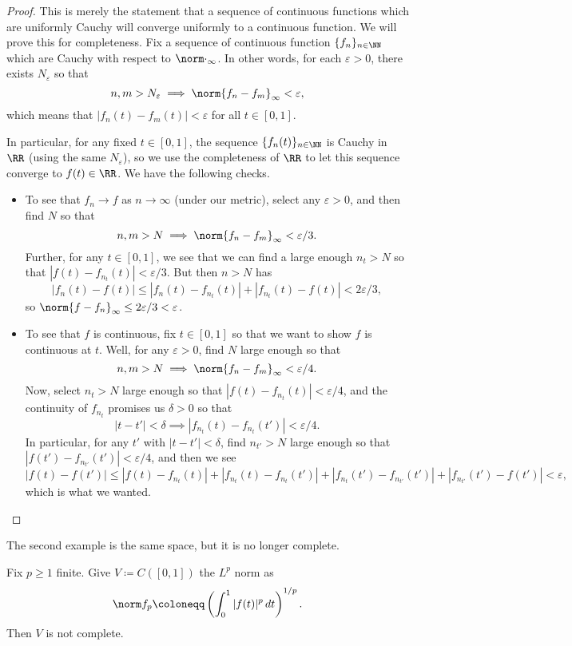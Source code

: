 \documentclass[../notes.tex]{subfiles}
\begin{document}
\begin{proof}
	This is merely the statement that a sequence of continuous functions which are uniformly Cauchy will converge uniformly to a continuous function. We will prove this for completeness. Fix a sequence of continuous function $\{f_n\}_{n\in\NN}$ which are Cauchy with respect to $\norm\cdot_\infty$. In other words, for each $\varepsilon>0$, there exists $N_\varepsilon$ so that
	\[n,m>N_\varepsilon\implies\norm{f_n-f_m}_\infty<\varepsilon,\]
	which means that $|f_n(t)-f_m(t)|<\varepsilon$ for all $t\in[0,1]$.

	In particular, for any fixed $t\in[0,1]$, the sequence $\{f_n(t)\}_{n\in\NN}$ is Cauchy in $\RR$ (using the same $N_\varepsilon$), so we use the completeness of $\RR$ to let this sequence converge to $f(t)\in\RR$. We have the following checks.
	\begin{itemize}
		\item To see that $f_n\to f$ as $n\to\infty$ (under our metric), select any $\varepsilon>0$, and then find $N$ so that
		\[n,m>N\implies\norm{f_n-f_m}_\infty<\varepsilon/3.\]
		Further, for any $t\in[0,1]$, we see that we can find a large enough $n_t>N$ so that $|f(t)-f_{n_t}(t)|<\varepsilon/3$. But then $n>N$ has
		\[|f_n(t)-f(t)|\le|f_n(t)-f_{n_t}(t)|+|f_{n_t}(t)-f(t)|<2\varepsilon/3,\]
		so $\norm{f-f_n}_\infty\le2\varepsilon/3<\varepsilon$.
		\item To see that $f$ is continuous, fix $t\in[0,1]$ so that we want to show $f$ is continuous at $t$. Well, for any $\varepsilon>0$, find $N$ large enough so that
		\[n,m>N\implies\norm{f_n-f_m}_\infty<\varepsilon/4.\]
		Now, select $n_t>N$ large enough so that $|f(t)-f_{n_t}(t)|<\varepsilon/4$, and the continuity of $f_{n_t}$ promises us $\delta>0$ so that
		\[|t-t'|<\delta\implies|f_{n_t}(t)-f_{n_t}(t')|<\varepsilon/4.\]
		In particular, for any $t'$ with $|t-t'|<\delta$, find $n_{t'}>N$ large enough so that $|f(t')-f_{n_{t'}}(t')|<\varepsilon/4$, and then we see
		\[|f(t)-f(t')|\le|f(t)-f_{n_t}(t)|+|f_{n_t}(t)-f_{n_{t}}(t')|+|f_{n_t}(t')-f_{n_{t'}}(t')|+|f_{n_{t'}}(t')-f(t')|<\varepsilon,\]
		which is what we wanted.
		\qedhere
	\end{itemize}
\end{proof}
The second example is the same space, but it is no longer complete.
\begin{example}
	Fix $p\ge1$ finite. Give $V\coloneqq C([0,1])$ the $L^p$ norm as
	\[\norm f_p\coloneqq\left(\int_0^1|f(t)|^p\,dt\right)^{1/p}.\]
	Then $V$ is not complete.
\end{example}
\end{document}
